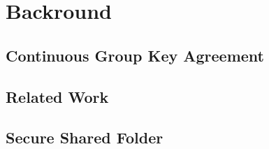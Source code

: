 \chapter{Backround}

\section{Continuous Group Key Agreement}


\section{Related Work}

\section{Secure Shared Folder}


